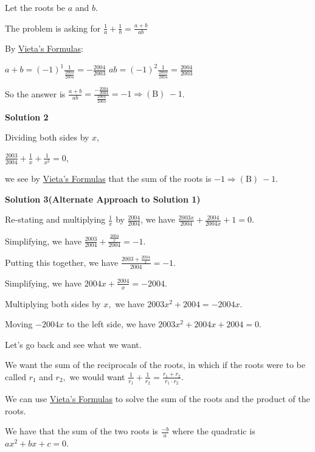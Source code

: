 \begin{enumerate}
 Let the roots be $a$ and $b$. 

 The problem is asking for $\frac{1}{a}+\frac{1}{b}= \frac{a+b}{ab}$

 By \href{https://artofproblemsolving.com/wiki/index.php?title=Vieta\%27s\_Formulas}{Vieta's Formulas}: 

 $a+b=(-1)^{1}\frac{1}{\frac{2003}{2004}}=-\frac{2004}{2003}$
$ab=(-1)^{2}\frac{1}{\frac{2003}{2004}}=\frac{2004}{2003}$

 So the answer is $\frac{a+b}{ab}=\frac{-\frac{2004}{2003}}{\frac{2004}{2003}}=-1 \Rightarrow\boxed{\mathrm{(B)}\ -1}$.

 



\textbf{Solution 2}

Dividing both sides by $x$, 

 $\frac{2003}{2004}+\frac 1x+\frac{1}{x^2}=0$, 

 we see by \href{https://artofproblemsolving.com/wiki/index.php?title=Vieta\%27s\_Formulas}{Vieta's Formulas} that the sum of the roots is $-1  \Rightarrow\boxed{\mathrm{(B)}\ -1}$.

 



\textbf{Solution 3(Alternate Approach to Solution 1)}

Re-stating and multiplying $\frac{1}{x}$ by $\frac{2004}{2004}$, we have $\frac{2003x}{2004} + \frac{2004}{2004x} + 1 = 0$.

 Simplifying, we have $\frac{2003}{2004}+\frac{\frac{2004}{x}}{2004}=-1.$

 Putting this together, we have $\frac{2003+\frac{2004}{x}}{2004}=-1.$

 Simplifying, we have $2004x + \frac{2004}{x} = -2004.$

 Multiplying both sides by $x,$ we have $2003x^2+2004=-2004x.$

 Moving $-2004x$ to the left side, we have $2003x^2 + 2004x + 2004 = 0.$

 Let's go back and see what we want.

 We want the sum of the reciprocals of the roots, in which if the roots were to be called $r_1$ and $r_2,$ we would want $\frac{1}{r_1}+\frac{1}{r_2}=\frac{r_1 + r_2}{r_1 \cdot r_2}$.

 We can use \href{https://artofproblemsolving.com/wiki/index.php?title=Vieta\%27s\_Formulas}{Vieta's Formulas} to solve the sum of the roots and the product of the roots.

 We have that the sum of the two roots is $\frac{-b}{a}$ where the quadratic is $ax^2+bx+c=0.$


\end{enumerate}
